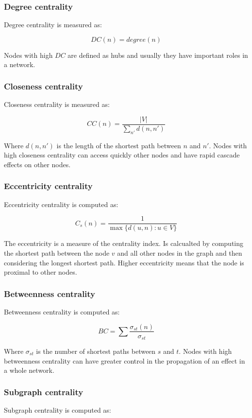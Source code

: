 		\subsubsection{Degree centrality}
		Degree centrality is measured as:

		$$DC(n) = degree(n)$$

		Nodes with high $DC$ are defined as hubs and usually they have important roles in a network.

		\subsubsection{Closeness centrality}
		Closeness centrality is measured as:

		$$CC(n) = \frac{|V|}{\sum\limits_{n'}d(n,n')}$$

		Where $d(n,n')$ is the length of the shortest path between $n$ and $n'$.
		Nodes with high closeness centrality can access quickly other nodes and have rapid cascade effects on other nodes.

		\subsubsection{Eccentricity centrality}
		Eccentricity centrality is computed as:

		$$C_s(n) = \frac{1}{\max\{d(u,n):u\in V\}}$$

		The eccentricity is a measure of the centrality index.
		Is calcualted by computing the shortest path between the node $v$ and all other nodes in the graph and then considering the longest shortest path.
		Higher eccentricity means that the node is proximal to other nodes.

		\subsubsection{Betweenness centrality}
		Betweenness centrality is computed as:

		$$BC = \sum\frac{\sigma_{st}(n)}{\sigma_{st}}$$

		Where $\sigma_{st}$ is the number of shortest paths between $s$ and $t$.
		Nodes with high betweenness centrality can have greater control in the propagation of an effect in a whole network.

		\subsubsection{Subgraph centrality}
		Subgraph centrality is computed as:

